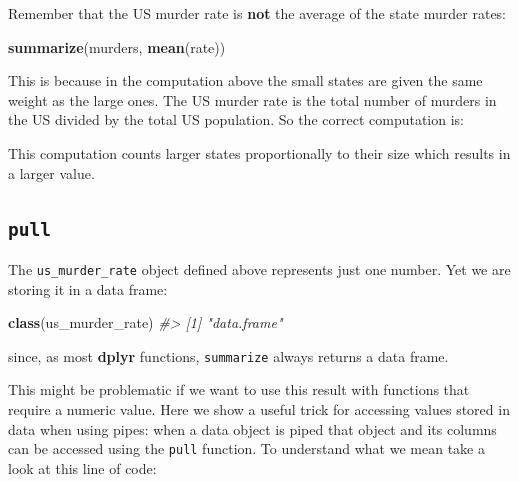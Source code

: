 \documentclass[
]{krantz}
\newenvironment{Shaded}{\begin{snugshade}}{\end{snugshade}}
\newcommand{\CommentTok}[1]{\textcolor[rgb]{0.37,0.37,0.37}{\textit{#1}}}
\newcommand{\DataTypeTok}[1]{\textcolor[rgb]{0.27,0.27,0.27}{#1}}
\newcommand{\DecValTok}[1]{\textcolor[rgb]{0.06,0.06,0.06}{#1}}
\newcommand{\KeywordTok}[1]{\textcolor[rgb]{0.27,0.27,0.27}{\textbf{#1}}}
\newcommand{\NormalTok}[1]{#1}
\newcommand{\OperatorTok}[1]{\textcolor[rgb]{0.43,0.43,0.43}{\textbf{#1}}}
\newcommand{\StringTok}[1]{\textcolor[rgb]{0.5,0.5,0.5}{#1}}
\begin{document}
Remember that the US murder rate is \textbf{not} the average of the state murder rates:

\begin{Shaded}
\begin{Highlighting}[]
\KeywordTok{summarize}\NormalTok{(murders, }\KeywordTok{mean}\NormalTok{(rate))}
\end{Highlighting}
\end{Shaded}

This is because in the computation above the small states are given the same weight as the large ones. The US murder rate is the total number of murders in the US divided by the total US population. So the correct computation is:

\begin{Shaded}
\end{Shaded}

This computation counts larger states proportionally to their size which results in a larger value.

\hypertarget{pull}{%
\subsection{\texorpdfstring{\texttt{pull}}{pull}}\label{pull}}

The \texttt{us\_murder\_rate} object defined above represents just one number. Yet we are storing it in a data frame:

\begin{Shaded}
\begin{Highlighting}[]
\KeywordTok{class}\NormalTok{(us_murder_rate)}
\CommentTok{#> [1] "data.frame"}
\end{Highlighting}
\end{Shaded}

since, as most \textbf{dplyr} functions, \texttt{summarize} always returns a data frame.

This might be problematic if we want to use this result with functions that require a numeric value. Here we show a useful trick for accessing values stored in data when using pipes: when a data object is piped that object and its columns can be accessed using the \texttt{pull} function. To understand what we mean take a look at this line of code:
\end{document}

